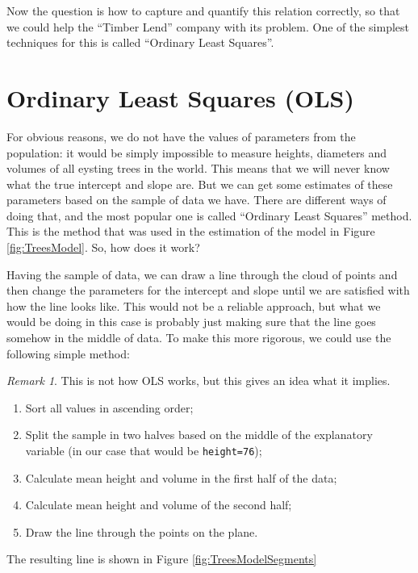\documentclass[
]{book}
\providecommand{\tightlist}{%
  \setlength{\itemsep}{0pt}\setlength{\parskip}{0pt}}
\theoremstyle{definition}
\theoremstyle{definition}
\theoremstyle{definition}
\theoremstyle{definition}
\theoremstyle{remark}
\newtheorem*{remark}{Remark}
\begin{document}
Now the question is how to capture and quantify this relation correctly, so that we could help the ``Timber Lend'' company with its problem. One of the simplest techniques for this is called ``Ordinary Least Squares''.

\section{Ordinary Least Squares (OLS)}\label{OLS}

For obvious reasons, we do not have the values of parameters from the population: it would be simply impossible to measure heights, diameters and volumes of all eysting trees in the world. This means that we will never know what the true intercept and slope are. But we can get some estimates of these parameters based on the sample of data we have. There are different ways of doing that, and the most popular one is called ``Ordinary Least Squares'' method. This is the method that was used in the estimation of the model in Figure \ref{fig:TreesModel}. So, how does it work?

Having the sample of data, we can draw a line through the cloud of points and then change the parameters for the intercept and slope until we are satisfied with how the line looks like. This would not be a reliable approach, but what we would be doing in this case is probably just making sure that the line goes somehow in the middle of data. To make this more rigorous, we could use the following simple method:

\begin{remark}
This is not how OLS works, but this gives an idea what it implies.
\end{remark}

\begin{enumerate}
\def\labelenumi{\arabic{enumi}.}
\tightlist
\item
  Sort all values in ascending order;
\item
  Split the sample in two halves based on the middle of the explanatory variable (in our case that would be \texttt{height=76});
\item
  Calculate mean height and volume in the first half of the data;
\item
  Calculate mean height and volume of the second half;
\item
  Draw the line through the points on the plane.
\end{enumerate}

The resulting line is shown in Figure \ref{fig:TreesModelSegments}
\end{document}
